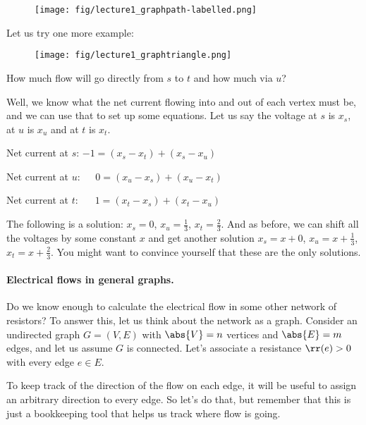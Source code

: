 \begin{figure}[H]
  \centering
  \texttt{[image: fig/lecture1\_graphpath-labelled.png]}
  \label{fig:graphpathlabelled}
\end{figure}


Let us try one more example:

\begin{figure}[H]
  \centering
  \texttt{[image: fig/lecture1\_graphtriangle.png]}
  \label{fig:graphtriangle}
\end{figure}

How much flow will go directly from $s$ to $t$ and how much via $u$?

Well, we know what the net current flowing into and out of each vertex
must be, and we can use that to set up some equations.
Let us say the voltage at $s$ is $x_s$, at $u$ is $x_u$ and at $t$ is $x_t$.
\begin{tight_itemize}
\item Net current at $s$:   $-1 = (x_s-x_t) + (x_s-x_u)$
\item  Net current at $u$:   $\phantom{-}0 = (x_u-x_s) + (x_u-x_t)$
\item Net current at  $t$:\,   $\phantom{-}1 = (x_t-x_s)+(x_t-x_u)$
\end{tight_itemize}
The following is a solution: $x_s = 0$, $x_u = \frac{1}{3}$, $x_t
= \frac{2}{3}$.
And as before, we can shift all the voltages by some constant $x$ and
get another solution $x_s = x+0$, $x_u = x+\frac{1}{3}$, $x_t
= x+\frac{2}{3}$. You might want to convince yourself that these are the only solutions.

\paragraph{Electrical flows in general graphs.}
Do we know enough to calculate the electrical flow in some other
network of resistors?
To answer this, let us think about the network
as a graph.
Consider an undirected graph $G = (V,E)$ with $\abs{V} = n$ vertices and
$\abs{E} = m$ edges, and let us assume $G$ is connected.
Let's associate a resistance
$\rr(e) > 0$ with every edge $e \in E$.

To keep track of the direction of the flow on each edge, it will be
useful to assign an arbitrary direction to every edge. So let's do
that, but remember that this is just a bookkeeping tool that helps
us track where flow is going.

